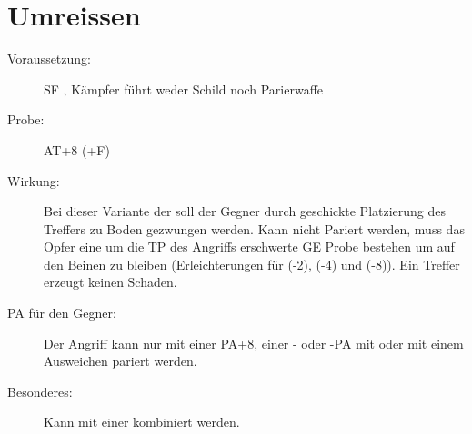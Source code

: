 \section{Umreissen}
\label{bAT.umreissen}
\begin{description}
    \item[Voraussetzung:]
        SF , Kämpfer führt weder Schild noch Parierwaffe
    \item[Probe:]
        AT+8 (+F)
    \item[Wirkung:]
        Bei dieser Variante der  soll der Gegner durch geschickte Platzierung des Treffers zu Boden gezwungen werden.
        Kann nicht Pariert werden, muss das Opfer eine um die TP des Angriffs erschwerte GE Probe bestehen um auf den Beinen zu bleiben (Erleichterungen für  (-2),  (-4) und  (-8)).
        Ein Treffer erzeugt keinen Schaden.
    \item[PA für den Gegner:]
        Der Angriff kann nur mit einer PA+8, einer - oder -PA mit  oder mit einem Ausweichen pariert werden.
    \item[Besonderes:]
        Kann mit einer  kombiniert werden.
\end{description}
